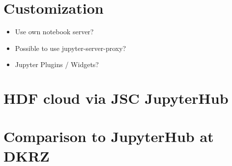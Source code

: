\documentclass[11pt,a4paper]{article}
\begin{document}
\section{Customization}
\label{s-customization}

\begin{itemize}
	\item Use own notebook server?
  \item Possible to use jupyter-server-proxy?
  \item Jupyter Plugins / Widgets?
\end{itemize}


\section{HDF cloud via JSC JupyterHub}
\label{s-hdfcloud-jsc-jhub}


\section{Comparison to JupyterHub at DKRZ}
\label{s-comparison-dkrz}



\end{document}
